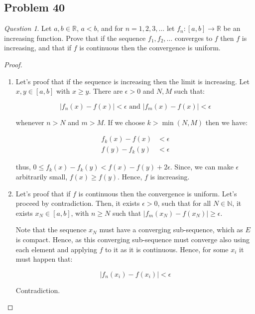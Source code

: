 \documentclass[11pt]{article}
\theoremstyle{definition}
\theoremstyle{remark}
\theoremstyle{remark}
\newtheorem{question}{Question}
\newcommand{\N}{\mathbb{N}}
\newcommand{\R}{{\mathbb{R}}}
\newcommand{\ri}{\rightarrow}
\begin{document}
\subsection{Problem 40}
\begin{question}
  Let $a, b \in \R$, $a < b$, and for $n = 1, 2, 3, \dots$ let
  $f_n:[a,b] \ri \R$ be an increasing function. Prove that if the
  sequence $f_1, f_2, \dots$ converges to $f$ then $f$ is increasing,
  and that if $f$ is continuous then the convergence is uniform.
\end{question}

\begin{proof}
  \begin{enumerate}
  \item Let's proof that if the sequence is increasing then the limit
    is increasing. Let $x,y \in [a, b]$ with $x \ge y$. There are
    $\epsilon > 0$ and $N, M$ such that:

    \begin{equation*}
      |f_n(x)-f(x)| < \epsilon \text{ and } |f_m(x) - f(x)| <
      \epsilon
    \end{equation*}

    whenever $n > N$ and $m > M$. If we choose $k > \min(N,M)$ then
    we have:

    \begin{equation*}
      \begin{split}
        f_k(x) - f(x) &<\epsilon \\
        f(y) - f_k(y) &< \epsilon
      \end{split}
    \end{equation*}

    thus, $0 \le f_k(x) - f_k(y) < f(x) - f(y) + 2\epsilon$. Since,
    we can make $\epsilon$ arbitrarily small, $f(x) \ge f(y)$. Hence,
    $f$ is increasing.
  \item Let's proof that if $f$ is continuous then the convergence is
    uniform. Let's proceed by contradiction. Then, it exists
    $\epsilon > 0$, such that for all $N \in \N$, it exists
    $x_N \in [a,b]$, with $n \ge N$ such that
    $|f_m(x_N) - f(x_N)| \ge \epsilon$.

    Note that the sequence $x_N$ must have a converging sub-sequence,
    which as $E$ is compact. Hence, as this converging sub-sequence
    must converge also using each element and applying $f$ to it as
    it is continuous. Hence, for some $x_i$ it must happen that:

    \begin{equation*}
      |f_n(x_i) - f(x_i)| < \epsilon
    \end{equation*}

    Contradiction.
  \end{enumerate}
\end{proof}
\end{document}
